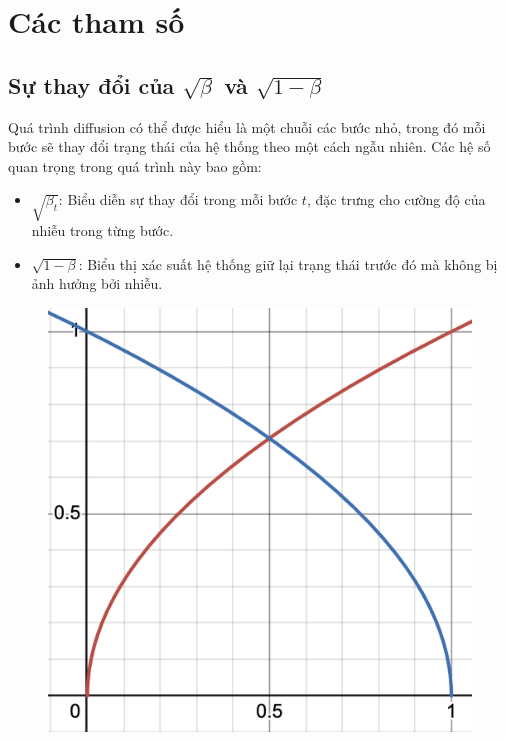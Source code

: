 \appendix

\chapter{Các tham số}
 \label{Appendix1}

\section{Sự thay đổi của $\sqrt{\beta}$ và $\sqrt{1-\beta}$}


Quá trình diffusion có thể được hiểu là một chuỗi các bước nhỏ, trong đó mỗi bước sẽ thay đổi trạng thái của hệ thống theo một cách ngẫu nhiên. Các hệ số quan trọng trong quá trình này bao gồm:
\begin{itemize}
	\item $\sqrt{\beta_t}$: Biểu diễn sự thay đổi trong mỗi bước $t$, đặc trưng cho cường độ của nhiễu trong từng bước.
	\item $\sqrt{1 - \beta}$: Biểu thị xác suất hệ thống giữ lại trạng thái trước đó mà không bị ảnh hưởng bởi nhiễu.
\end{itemize}

\begin{figure}
	\includegraphics[width=0.9\linewidth]{images/beta_sqrtbeta}
	\label{fig:wrapfig}
\end{figure}

